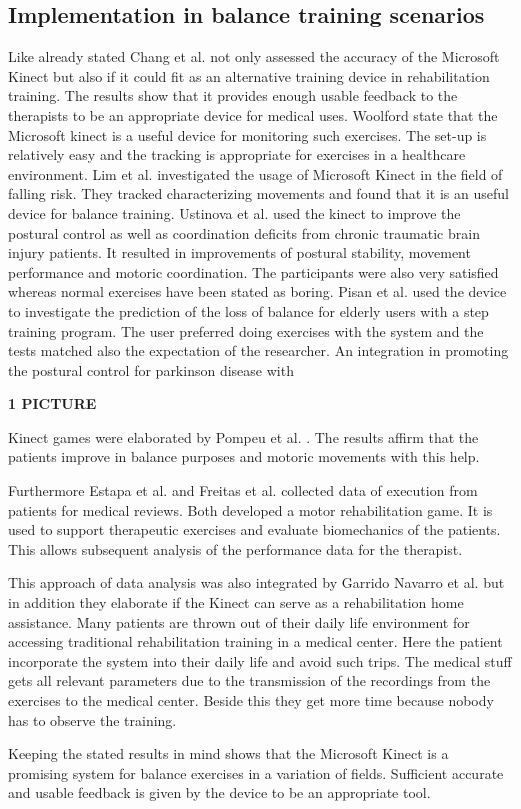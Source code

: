 \subsection{Implementation in balance training scenarios}

Like already stated Chang et al. \cite{Chang2012-hz} not only assessed the accuracy of the Microsoft Kinect but also if it could fit as an alternative training device in rehabilitation training. The results show that it provides enough usable feedback to the therapists to be an appropriate device for medical uses. Woolford \cite{Woolford2015-ub} state that the Microsoft kinect is a useful device for monitoring such exercises. The set-up is relatively easy and the tracking is appropriate for exercises in a healthcare environment. Lim et al. \cite{Lim2015-pw} investigated the usage of Microsoft Kinect in the field of falling risk. They tracked characterizing movements and found that it is an useful device for balance training. Ustinova et al. \cite{Ustinova2014-ml} used the kinect to improve the postural control as well as coordination deficits from chronic traumatic brain injury patients. It resulted in improvements of postural stability, movement performance and motoric coordination. The participants were also very satisfied whereas normal exercises have been stated as boring. Pisan et al. \cite{Pisan2013-sf} used the device to investigate the prediction of the loss of balance for elderly users with a step training program. The user preferred doing exercises with the system and the tests matched also the expectation of the researcher. An integration in promoting the postural control for parkinson disease with 

\textbf{1 PICTURE} \cite{Woolford2015-ub}

Kinect games were elaborated by Pompeu et al. \cite{Pompeu2014-yl} \cite{Pompeu2015-vp}. The results affirm that the patients improve in balance purposes and motoric movements with this help.

Furthermore Estapa et al. \cite{Estepa2016-oj} and Freitas et al. \cite{Freitas2012-ae} collected data of execution from patients for medical reviews. Both developed a motor rehabilitation game. It is used to support therapeutic exercises and evaluate biomechanics of the patients. This allows subsequent analysis of the performance data for the therapist.

This approach of data analysis was also integrated by Garrido Navarro et al. \cite{Garrido2013-zs} but in addition they elaborate if the Kinect can serve as a rehabilitation home assistance. Many patients are thrown out of their daily life environment for accessing traditional rehabilitation training in a medical center. Here the patient incorporate the system into their daily life and avoid such trips. The medical stuff gets all relevant parameters due to the transmission of the recordings from the exercises to the medical center. Beside this they get more time because nobody has to observe the training.

Keeping the stated results in mind shows that the Microsoft Kinect is a promising system for balance exercises in a variation of fields. Sufficient accurate and usable feedback is given by the device to be an appropriate tool.
